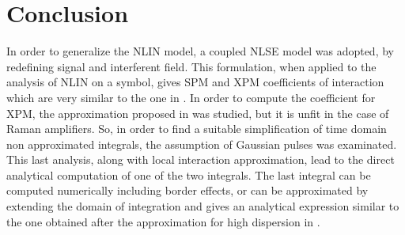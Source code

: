 \documentclass[10pt, lettersize, journal, onecolumn]{IEEEtran}
\begin{document}
\begin{comment}
Quindi dobbiamo verificare la seguente uguaglianza
\begin{equation}
	U_0 \sqrt{\dfrac{1+iD(z)}{1+D^2(z)}} \exp\left[-\dfrac{t^2}{2T_0^2} \dfrac{1+iD(z)}{1+D^2(z)}\right]  \stackrel{?}{=}  U_0 \sqrt{\frac{i}{2\pi D(z)}} \exp\left[-\dfrac{t^2}{2T_0^2} \left(\dfrac{1}{D^2(z)}\right)\right]
\end{equation}
Queste espressioni non sembrano tuttavia combaciare esattamente. Possiamo approssimare il termine di sinistra, per $D(z)>>1$ con
\begin{equation}
	U_0 \sqrt{\dfrac{i}{D(z)}} \exp\left[-\dfrac{t^2}{2T_0^2} \dfrac{1}{D^2(z)}\right] {\color{darkred} \exp\left[-\dfrac{t^2}{2T_0^2} \dfrac{i}{D(z)}\right]}
\end{equation}
tuttavia si nota che manca un termine $2\pi$ a \textit{denominatore}, e l'esponenziale di fase \textit{scompare} dall'espressione.

\vspace{20pt}
La conclusione \textit{provvisoria} è che l'approssimazione non vale in maniera esatta, ed anzi la sua validità nel caso Gaussiano è da valutare in un'ulteriore analisi.
\end{comment}

\section{Conclusion}
In order to generalize the NLIN model, a coupled NLSE model was adopted, by redefining signal and interferent field. This formulation, when applied to the analysis of NLIN on a symbol, gives SPM and XPM coefficients of interaction which are very similar to the one in \cite{Dar_2013}. In order to compute the coefficient for XPM, the approximation proposed in \cite{Dar_2013} was studied, but it is unfit in the case of Raman amplifiers. So, in order to find a suitable simplification of time domain non approximated integrals, the assumption of Gaussian pulses was examinated. This last analysis, along with local interaction approximation, lead to the direct analytical computation of one of the two integrals. The last integral can be computed numerically including border effects, or can be approximated by extending the domain of integration and gives an analytical expression similar to the one obtained after the approximation for high dispersion in \cite{Dar_2013}.

\printbibliography

\hrulefill
\end{document}
